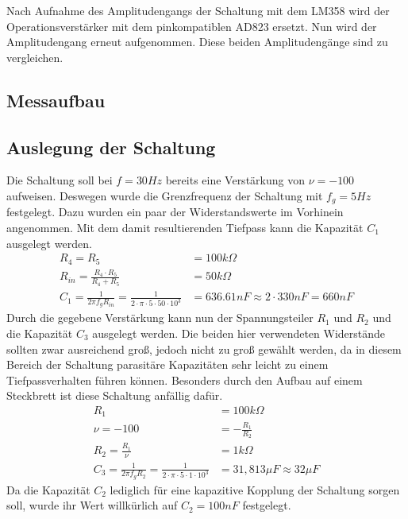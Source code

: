 Nach Aufnahme des Amplitudengangs der Schaltung mit dem LM358 wird der Operationsverstärker mit dem pinkompatiblen AD823 ersetzt. Nun wird der Amplitudengang erneut aufgenommen. Diese beiden Amplitudengänge sind zu vergleichen. 

\subsection{Messaufbau}
\subsection{Auslegung der Schaltung}
Die Schaltung soll bei $f=30Hz$ bereits eine Verstärkung von $\nu = -100$ aufweisen. Deswegen wurde die Grenzfrequenz der Schaltung mit $f_g=5Hz$ festgelegt. 
Dazu wurden ein paar der Widerstandswerte im Vorhinein angenommen. Mit dem damit resultierenden Tiefpass kann die Kapazität $C_1$ ausgelegt werden.
\begin{align}
    R_4=R_5 &= 100k\Omega \\
    R_{in} = \frac{R_4\cdot R_5}{R_4+ R_5} &= 50k\Omega \\
    C_1=\frac{1}{2\pi f_g R_{in}} = \frac{1}{2\cdot \pi \cdot 5\cdot50\cdot 10^3} &= 636.61nF \approx 2\cdot 330nF = 660nF
\end{align}
Durch die gegebene Verstärkung kann nun der Spannungsteiler $R_1$ und $R_2$ und die Kapazität $C_3$ ausgelegt werden. Die beiden hier verwendeten Widerstände sollten zwar ausreichend groß, jedoch nicht zu groß gewählt werden, da in diesem Bereich der Schaltung parasitäre Kapazitäten sehr leicht zu einem Tiefpassverhalten führen können. Besonders durch den Aufbau auf einem Steckbrett ist diese Schaltung anfällig dafür. 
\begin{align}
    R_1 &= 100k\Omega\\
    \nu = -100 &= -\frac{R_1}{R_2} \\
    R_2 = \frac{R_1}{\nu} &= 1k\Omega\\
    C_3=\frac{1}{2\pi f_g R_2} = \frac{1}{2\cdot \pi \cdot 5\cdot1\cdot 10^3} &= 31,813\mu F \approx 32\mu F
\end{align}
Da die Kapazität $C_2$ lediglich für eine kapazitive Kopplung der Schaltung sorgen soll, wurde ihr Wert willkürlich auf $C_2=100nF$ festgelegt. 

